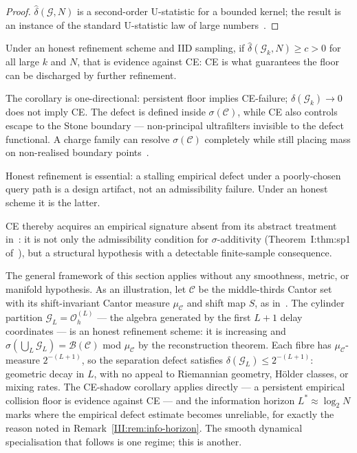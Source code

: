 \begin{proof}
$\hat\delta(\mathcal{G}, N)$ is a second-order U-statistic for a bounded
kernel; the result is an instance of the standard U-statistic law of large
numbers~\cite{Hoeffding1948}.
\end{proof}

\begin{corollary}[CE-shadow]
\label{III:cor:ce-shadow}
Under an honest refinement scheme and IID sampling, if
$\hat\delta(\mathcal{G}_k, N) \geq c > 0$ for all large $k$ and $N$,
that is evidence against CE: CE is what guarantees the floor can be
discharged by further refinement.
\end{corollary}

\begin{remark}[Scope]
\label{III:rem:ce-shadow-scope}
The corollary is one-directional: persistent floor implies CE-failure;
$\delta(\mathcal{G}_k) \to 0$ does not imply CE.  The defect is defined
inside $\sigma(\mathcal{C})$, while CE also controls escape to the Stone
boundary — non-principal ultrafilters invisible to the defect functional.
A charge family can resolve $\sigma(\mathcal{C})$ completely while still
placing mass on non-realised boundary points~\cite{mahon_paper1}.

Honest refinement is essential: a stalling empirical defect under a
poorly-chosen query path is a design artifact, not an admissibility
failure.  Under an honest scheme it is the latter.

CE thereby acquires an empirical signature absent from its abstract
treatment in~\cite{mahon_paper1}: it is not only the admissibility
condition for $\sigma$-additivity (Theorem~I:thm:sp1 of~\cite{mahon_paper1}),
but a structural hypothesis with a detectable finite-sample consequence.
\end{remark}

\begin{remark}
\label{III:rem:cantor-instance}
The general framework of this section applies without any smoothness, metric,
or manifold hypothesis.  As an illustration, let $\mathcal{C}$ be the
middle-thirds Cantor set with its shift-invariant Cantor measure $\mu_{\mathcal{C}}$
and shift map $S$, as in~\cite{mahon_paper2}.  The cylinder partition
$\mathcal{G}_L = \mathcal{O}_h^{(L)}$ --- the algebra generated by the first $L+1$
delay coordinates --- is an honest refinement scheme: it is increasing and
$\sigma(\bigcup_L \mathcal{G}_L) = \mathcal{B}(\mathcal{C})$ mod $\mu_{\mathcal{C}}$
by the reconstruction theorem.  Each fibre has $\mu_{\mathcal{C}}$-measure
$2^{-(L+1)}$, so the separation defect satisfies $\delta(\mathcal{G}_L) \leq
2^{-(L+1)}$: geometric decay in $L$, with no appeal to Riemannian geometry,
Hölder classes, or mixing rates.  The CE-shadow corollary applies directly ---
a persistent empirical collision floor is evidence against CE --- and the
information horizon $L^* \approx \log_2 N$ marks where the empirical defect
estimate becomes unreliable, for exactly the reason noted in
Remark~\ref{III:rem:info-horizon}.  The smooth dynamical specialisation that
follows is one regime; this is another.
\end{remark}


